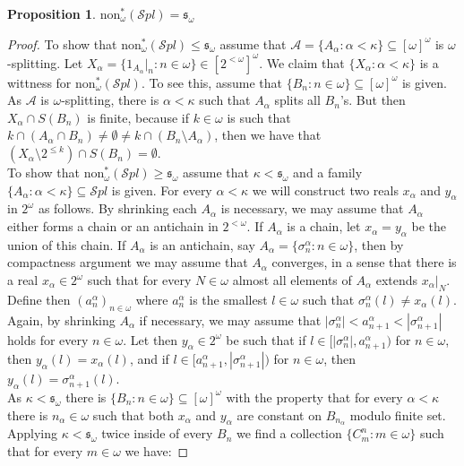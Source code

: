 \documentclass[a4paper]{amsart}
\newtheorem{proposition}[theorem]{Proposition}
\newcommand{\sss}{\mathfrak{s}}
\newcommand{\Cantor}{2^{\omega}}
\newcommand{\cantor}{2^{<\omega}}
\newcommand{\non}{\mathrm{non}}
\newcommand{\SPL}{\mathcal{S}pl}
\begin{document}
    \begin{proposition}
        $\non^{*}_{\omega}(\SPL)=\sss_{\omega}$
    \end{proposition}
    \begin{proof}
        To show that $\non^{*}_{\omega}(\SPL)\leq\sss_{\omega}$ assume that $\mathcal{A}=\{A_{\alpha}:\alpha<\kappa\}\subseteq[\omega]^{\omega}$ is $\omega$-splitting. Let $X_{\alpha}=\{1_{A_{\alpha}}|_{n}:n\in\omega\}\in[2^{<\omega}]^{\omega}$. We claim that $\{X_{\alpha}:\alpha<\kappa\}$ is a wittness for $\non^{*}_{\omega}(\SPL)$. To see this, assume that $\{B_{n}:n\in\omega\}\subseteq[\omega]^{\omega}$ is given. As $\mathcal{A}$ is $\omega$-splitting, there is $\alpha<\kappa$ such that $A_{\alpha}$ splits all $B_{n}$'s. But then $X_{\alpha}\cap S(B_{n})$ is finite, because if $k\in\omega$ is such that $k\cap(A_{\alpha}\cap B_{n})\neq\emptyset\neq k\cap(B_{n}\setminus A_{\alpha})$, then we have that $(X_{\alpha}\setminus 2^{\leq k})\cap S(B_{n})=\emptyset$.\\
        To show that $\non^{*}_{\omega}(\SPL)\geq\sss_{\omega}$ assume that $\kappa<\sss_{\omega}$ and a family $\{A_{\alpha}:\alpha<\kappa\}\subseteq\SPL$ is given. For every $\alpha<\kappa$ we will construct two reals $x_{\alpha}$ and $y_{\alpha}$ in $\Cantor$ as follows. By shrinking each $A_{\alpha}$ is necessary, we may assume that $A_{\alpha}$ either forms a chain or an antichain in $\cantor$. If $A_{\alpha}$ is a chain, let $x_{\alpha}=y_{\alpha}$ be the union of this chain. If $A_{\alpha}$ is an antichain, say $A_{\alpha}=\{\sigma^{\alpha}_{n}:n\in\omega\}$, then by compactness argument we may assume that $A_{\alpha}$ converges, in a sense that there is a real $x_{\alpha}\in\Cantor$ such that for every $N\in\omega$ almost all elements of $A_{\alpha}$ extends $x_{\alpha}|_{N}$. Define then $(a^{\alpha}_{n})_{n\in\omega}$ where $a^{\alpha}_{n}$ is the smallest $l\in\omega$ such that $\sigma^{\alpha}_{n}(l)\neq x_{\alpha}(l)$. Again, by shrinking $A_{\alpha}$ if necessary, we may assume that $|\sigma^{\alpha}_{n}|<a^{\alpha}_{n+1}<|\sigma^{\alpha}_{n+1}|$ holds for every $n\in\omega$. Let then $y_{\alpha}\in\Cantor$ be such that
        if $l\in[|\sigma^{\alpha}_{n}|,a^{\alpha}_{n+1})$ for $n\in\omega$, then 
        $y_{\alpha}(l)=x_{\alpha}(l)$, and if $l\in[a^{\alpha}_{n+1},|\sigma^{\alpha}_{n+1}|)$ for $n\in\omega$, then $y_{\alpha}(l)=\sigma^{\alpha}_{n+1}(l)$.\\
        As $\kappa<\sss_{\omega}$ there is $\{B_{n}:n\in\omega\}\subseteq[\omega]^{\omega}$ with the property that for every $\alpha<\kappa$ there is $n_{\alpha}\in\omega$ such that both $x_{\alpha}$ and $y_{\alpha}$ are constant on $B_{n_{\alpha}}$ modulo finite set. Applying $\kappa<\sss_{\omega}$ twice inside of every $B_{n}$ we find a collection $\{C^{n}_{m}:m\in\omega\}$ such that for every $m\in\omega$ we have:

\end{proof}
\end{document}
